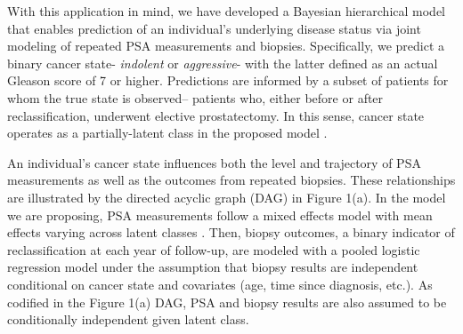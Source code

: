 \documentclass[12pt, letterpaper]{article}
\begin{document}
With this application in mind, we have developed a Bayesian hierarchical model that enables prediction of an individual's underlying disease status via joint modeling of repeated PSA measurements and biopsies. Specifically, we predict a binary cancer state- \textit{indolent} or \textit{aggressive}- with the latter defined as an actual Gleason score of 7 or higher. Predictions are informed by a subset of patients for whom the true state is observed-- patients who, either before or after reclassification, underwent elective prostatectomy. In this sense, cancer state operates as a partially-latent class in the proposed model \cite{Wu2015}. 

An individual's cancer state influences both the level and trajectory of PSA measurements as well as the outcomes from repeated biopsies. These relationships are illustrated by the directed acyclic graph (DAG) in Figure 1(a). In the model we are proposing, PSA measurements follow a mixed effects model with mean effects varying across latent classes \cite{Laird1982}. Then, biopsy outcomes, a binary indicator of reclassification at each year of follow-up, are modeled with a pooled logistic regression model under the assumption that biopsy results are independent conditional on cancer state and covariates (age, time since diagnosis, etc.)\cite{Cupples1988,D'Agostino1990}. As codified in the Figure 1(a) DAG, PSA and biopsy results are also assumed to be conditionally independent given latent class. 
\end{document}
